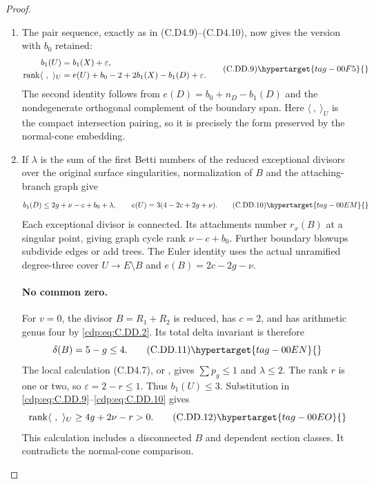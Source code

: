 \begin{proof}
\begin{enumerate}[label={$\langle1\rangle$\arabic*.},leftmargin=*]
\item The pair sequence, exactly as in (C.D4.9)--(C.D4.10),
now gives the version with $b_0$ retained:
\[
\begin{split}
 b_1(U)&=b_1(X)+\varepsilon,\\
 \operatorname{rank}\langle\ ,\ \rangle_U
 &=e(U)+b_0-2+2b_1(X)-b_1(D)+\varepsilon.
\end{split}
\tag{C.DD.9}\hypertarget{tag-00F5}{}\label{cdp:eq:C.DD.9}
\]
The second identity follows from
$e(D)=b_0+n_D-b_1(D)$ and the nondegenerate
orthogonal complement of the boundary span. Here
$\langle\ ,\ \rangle_U$ is the compact intersection
pairing, so it is precisely the form preserved by
the normal-cone embedding.

\item If $\lambda$ is the sum of the first Betti numbers
of the reduced exceptional divisors over the original
surface singularities, normalization of $B$ and the
attaching-branch graph give
\[
 b_1(D)\le2g+\nu-c+b_0+\lambda,
 \qquad e(U)=3(4-2c+2g+\nu).
\tag{C.DD.10}\hypertarget{tag-00EM}{}\label{cdp:eq:C.DD.10}
\]
Each exceptional divisor is connected. Its attachments
number $r_x(B)$ at a singular point, giving graph
cycle rank $\nu-c+b_0$. Further boundary blowups
subdivide edges or add trees. The Euler identity
uses the actual unramified degree-three cover
$U\to E\setminus B$ and
$e(B)=2c-2g-\nu$.

\paragraph{No common zero.}
For $v=0$, the divisor $B=R_1+R_2$ is reduced,
has $c=2$, and has arithmetic genus four by
\eqref{cdp:eq:C.DD.2}. Its total delta invariant is therefore
\[
                         \delta(B)=5-g\le4.
\tag{C.DD.11}\hypertarget{tag-00EN}{}\label{cdp:eq:C.DD.11}
\]
The local calculation (C.D4.7), or ,
gives $\sum p_g\le1$ and $\lambda\le2$.
The rank $r$ is one or two, so
$\varepsilon=2-r\le1$. Thus $b_1(U)\le3$.
Substitution in \eqref{cdp:eq:C.DD.9}--\eqref{cdp:eq:C.DD.10} gives
\[
                  \operatorname{rank}\langle\ ,\ \rangle_U
                        \ge4g+2\nu-r>0.
\tag{C.DD.12}\hypertarget{tag-00EO}{}\label{cdp:eq:C.DD.12}
\]
This calculation includes a disconnected $B$ and
dependent section classes. It contradicts the
normal-cone comparison.


\end{enumerate}
\end{proof}
